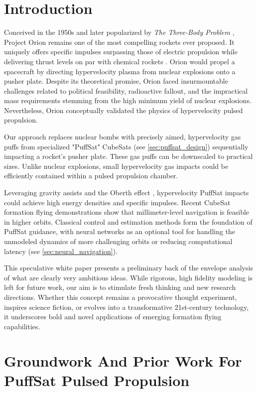 \documentclass{article}
\begin{document}
\section{Introduction}
Conceived in the 1950s and later popularized by \textit{The Three-Body Problem} \cite{liu2014three}, Project Orion remains one of the most compelling rockets ever proposed. It uniquely offers specific impulses surpassing those of electric propulsion while delivering thrust levels on par with chemical rockets \cite{projorion}.   Orion would propel a spacecraft by directing hypervelocity plasma from nuclear explosions onto a pusher plate. Despite its theoretical promise, Orion faced insurmountable challenges related to political feasibility, radioactive fallout, and the impractical mass requirements stemming from the high minimum yield of nuclear explosions. Nevertheless, Orion conceptually validated the physics of hypervelocity pulsed propulsion.   

Our approach replaces nuclear bombs with precisely aimed, hypervelocity gas puffs from specialized "PuffSat" CubeSats (see \autoref{sec:puffsat_design}) sequentially impacting a rocket's pusher plate. These gas puffs can be downscaled to practical sizes.  Unlike nuclear explosions, small hypervelocity gas impacts could be efficiently contained within a pulsed propulsion chamber.

Leveraging gravity assists and the Oberth effect \cite{oberth_effect}, hypervelocity PuffSat impacts could achieve high energy densities and specific impulses.  Recent CubeSat formation flying demonstrations show that millimeter-level navigation is feasible in higher orbits. Classical control and estimation methods form the foundation of PuffSat guidance, with neural networks  as an optional tool for handling the unmodeled dynamics of more challenging orbits or reducing computational latency (see \autoref{sec:neural_navigation}).  

This speculative white paper presents a preliminary back of the envelope analysis of what are clearly very ambitious ideas. While rigorous, high fidelity modeling is left for future work, our aim is to stimulate fresh thinking and new research directions. Whether this concept remains a provocative thought experiment, inspires science fiction, or evolves into a transformative 21st-century technology, it underscores bold and novel applications of emerging formation flying capabilities. 

\section{Groundwork And Prior Work For PuffSat Pulsed Propulsion}
\end{document}
